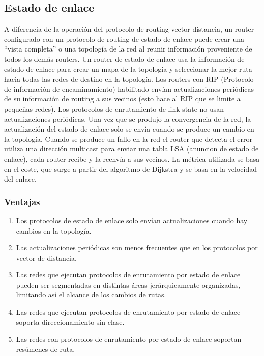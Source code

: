 \documentclass[
	12pt, %
	fleqn, %
	a4paper, %
	oneside, %
]{LegrandOrangeBook}
\begin{document}
\subsection{Estado de enlace}
A diferencia de la operación del protocolo de routing vector distancia, un router configurado con un protocolo de routing de estado de enlace puede crear una ``vista completa'' o una topología de la red al reunir información proveniente de todos los demás routers. Un router de estado de enlace usa la información de estado de enlace para crear un mapa de la topología y seleccionar la mejor ruta hacia todas las redes de destino en la topología. Los routers con RIP (Protocolo de información de encaminamiento) habilitado envían actualizaciones periódicas de su información de routing a sus vecinos (esto hace al RIP que se limite a pequeñas redes). Los protocolos de enrutamiento de link-state no usan actualizaciones periódicas. Una vez que se produjo la convergencia de la red, la actualización del estado de enlace solo se envía cuando se produce un cambio en la topología. Cuando se produce un fallo en la red el router que detecta el error utiliza una dirección multicast para enviar una tabla LSA (anuncion de estado de enlace), cada router recibe y la reenvía a sus vecinos. La métrica utilizada se basa en el coste, que surge a partir del algoritmo de Dijkstra y se basa en la velocidad del enlace.
\subsubsection*{Ventajas}
\begin{enumerate}
\item Los protocolos de estado de enlace solo envían actualizaciones cuando
hay cambios en la topología.
\item Las actualizaciones periódicas son menos frecuentes que en los protocolos por vector de distancia.
\item Las redes que ejecutan protocolos de enrutamiento por estado de enlace pueden ser segmentadas en distintas áreas jerárquicamente organizadas, limitando así el alcance de los cambios de rutas.
\item Las redes que ejecutan protocolos de enrutamiento por estado de enlace soporta direccionamiento sin clase.
\item Las redes con protocolos de enrutamiento por estado de enlace soportan resúmenes de ruta.
\end{enumerate}
\end{document}
